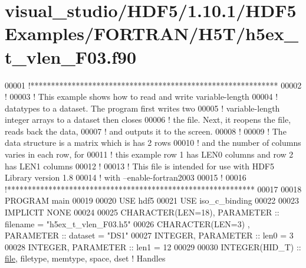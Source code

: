 \hypertarget{visual__studio_2_h_d_f5_21_810_81_2_h_d_f5_examples_2_f_o_r_t_r_a_n_2_h5_t_2h5ex__t__vlen___f03_8f90_source}{}\section{visual\+\_\+studio/\+H\+D\+F5/1.10.1/\+H\+D\+F5\+Examples/\+F\+O\+R\+T\+R\+A\+N/\+H5\+T/h5ex\+\_\+t\+\_\+vlen\+\_\+\+F03.f90}
\label{visual__studio_2_h_d_f5_21_810_81_2_h_d_f5_examples_2_f_o_r_t_r_a_n_2_h5_t_2h5ex__t__vlen___f03_8f90_source}

\begin{DoxyCode}
00001 \textcolor{comment}{!************************************************************}
00002 \textcolor{comment}{!}
00003 \textcolor{comment}{!  This example shows how to read and write variable-length}
00004 \textcolor{comment}{!  datatypes to a dataset.  The program first writes two}
00005 \textcolor{comment}{!  variable-length integer arrays to a dataset then closes}
00006 \textcolor{comment}{!  the file.  Next, it reopens the file, reads back the data,}
00007 \textcolor{comment}{!  and outputs it to the screen.}
00008 \textcolor{comment}{!}
00009 \textcolor{comment}{!  The data structure is a matrix which is has 2 rows}
00010 \textcolor{comment}{!  and the number of columns varies in each row, for }
00011 \textcolor{comment}{!  this example row 1 has LEN0 columns and row 2 has LEN1 columns}
00012 \textcolor{comment}{!}
00013 \textcolor{comment}{!  This file is intended for use with HDF5 Library version 1.8}
00014 \textcolor{comment}{!  with --enable-fortran2003 }
00015 \textcolor{comment}{!}
00016 \textcolor{comment}{!************************************************************}
00017 
00018 \textcolor{keyword}{PROGRAM} main
00019 
00020   \textcolor{keywordtype}{USE }hdf5
00021   \textcolor{keywordtype}{USE }iso\_c\_binding
00022   
00023   \textcolor{keywordtype}{IMPLICIT NONE}
00024 
00025   \textcolor{keywordtype}{CHARACTER(LEN=18)}, \textcolor{keywordtype}{PARAMETER} :: filename  = \textcolor{stringliteral}{"h5ex\_t\_vlen\_F03.h5"}
00026   \textcolor{keywordtype}{CHARACTER(LEN=3)} , \textcolor{keywordtype}{PARAMETER} :: dataset   = \textcolor{stringliteral}{"DS1"}
00027   \textcolor{keywordtype}{INTEGER}, \textcolor{keywordtype}{PARAMETER} :: len0 = 3
00028   \textcolor{keywordtype}{INTEGER}, \textcolor{keywordtype}{PARAMETER} :: len1 = 12
00029 
00030   \textcolor{keywordtype}{INTEGER(HID\_T)}  :: \hyperlink{structfile}{file}, filetype, memtype, space, dset \textcolor{comment}{! Handles}

\end{DoxyCode}
